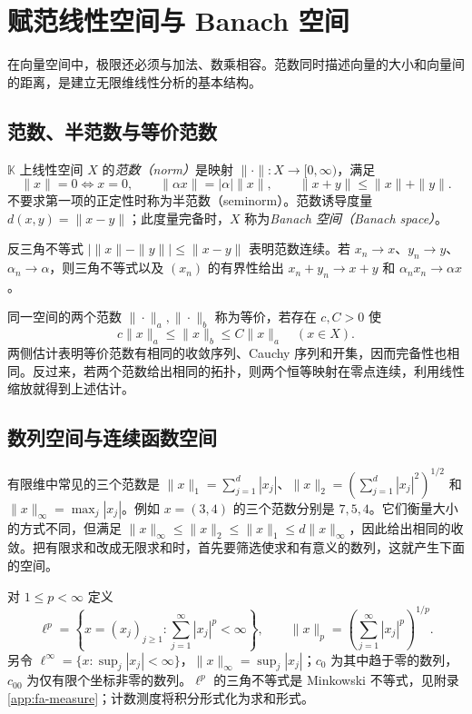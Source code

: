 \setcounter{chapter}{2} %
\chapter{赋范线性空间与 Banach 空间}
\label{chap:fa-banach}

在向量空间中，极限还必须与加法、数乘相容。范数同时描述向量的大小和向量间的距离，是建立无限维线性分析的基本结构。

\section{范数、半范数与等价范数}
\begin{definition}
$\mathbb K$ 上线性空间 $X$ 的\emph{范数（norm）}是映射 $\|\cdot\|:X\to[0,\infty)$，满足
\[
 \|x\|=0\iff x=0,\qquad \|\alpha x\|=|\alpha|\|x\|,\qquad
 \|x+y\|\leq\|x\|+\|y\|.
\]
不要求第一项的正定性时称为半范数（seminorm）。范数诱导度量 $d(x,y)=\|x-y\|$；此度量完备时，$X$ 称为\emph{Banach 空间（Banach space）}。
\end{definition}
反三角不等式 $|\|x\|-\|y\||\leq\|x-y\|$ 表明范数连续。若 $x_n\to x$、$y_n\to y$、$\alpha_n\to\alpha$，则三角不等式以及 $(x_n)$ 的有界性给出 $x_n+y_n\to x+y$ 和 $\alpha_nx_n\to\alpha x$。

同一空间的两个范数 $\|\cdot\|_a,\|\cdot\|_b$ 称为等价，若存在 $c,C>0$ 使
\[
 c\|x\|_a\leq\|x\|_b\leq C\|x\|_a\quad(x\in X).
\]
两侧估计表明等价范数有相同的收敛序列、Cauchy 序列和开集，因而完备性也相同。反过来，若两个范数给出相同的拓扑，则两个恒等映射在零点连续，利用线性缩放就得到上述估计。

\section{数列空间与连续函数空间}
有限维中常见的三个范数是 $\|x\|_1=\sum_{j=1}^d|x_j|$、$\|x\|_2=(\sum_{j=1}^d|x_j|^2)^{1/2}$ 和 $\|x\|_\infty=\max_j|x_j|$。例如 $x=(3,4)$ 的三个范数分别是 $7,5,4$。它们衡量大小的方式不同，但满足 $\|x\|_\infty\leq\|x\|_2\leq\|x\|_1\leq d\|x\|_\infty$，因此给出相同的收敛。把有限求和改成无限求和时，首先要筛选使求和有意义的数列，这就产生下面的空间。

对 $1\leq p<\infty$ 定义
\[
 \ell^p=\left\{x=(x_j)_{j\geq1}:\sum_{j=1}^\infty|x_j|^p<\infty\right\},
 \qquad \|x\|_p=\left(\sum_{j=1}^\infty|x_j|^p\right)^{1/p}.
\]
另令 $\ell^\infty=\{x:\sup_j|x_j|<\infty\}$，$\|x\|_\infty=\sup_j|x_j|$；$c_0$ 为其中趋于零的数列，$c_{00}$ 为仅有限个坐标非零的数列。$\ell^p$ 的三角不等式是 Minkowski 不等式，见附录\ref{app:fa-measure}；计数测度将积分形式化为求和形式。

